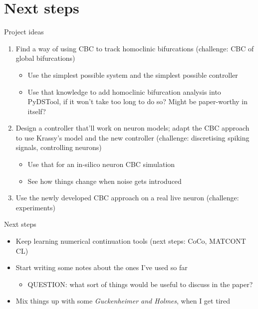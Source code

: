 \documentclass[presentation]{beamer}
\begin{document}
\section{Next steps}
\label{sec:orgd39a465}
\begin{frame}[label={sec:orgcdb2d33}]{Project ideas}
\begin{enumerate}
\item Find a way of using CBC to track homoclinic bifurcations (challenge: CBC of global bifurcations)
\begin{itemize}
\item Use the simplest possible system and the simplest possible controller
\item Use that knowledge to add homoclinic bifurcation analysis into PyDSTool, if it won't take too long to do so? Might be paper-worthy in itself?
\end{itemize}
\item Design a controller that'll work on neuron models; adapt the CBC approach to use Krassy's model and the new controller (challenge: discretising spiking signals, controlling neurons)
\begin{itemize}
\item Use that for an in-silico neuron CBC simulation
\item See how things change when noise gets introduced
\end{itemize}
\item Use the newly developed CBC approach on a real live neuron (challenge: experiments)
\end{enumerate}
\end{frame}
\begin{frame}[label={sec:orgadc513a}]{Next steps}
\begin{itemize}
\item Keep learning numerical continuation tools (next steps: CoCo, MATCONT CL)
\item Start writing some notes about the ones I've used so far
\begin{itemize}
\item QUESTION: what sort of things would be useful to discuss in the paper?
\end{itemize}
\item Mix things up with some \emph{Guckenheimer and Holmes}, when I get tired
\end{itemize}
\end{frame}
\end{document}
